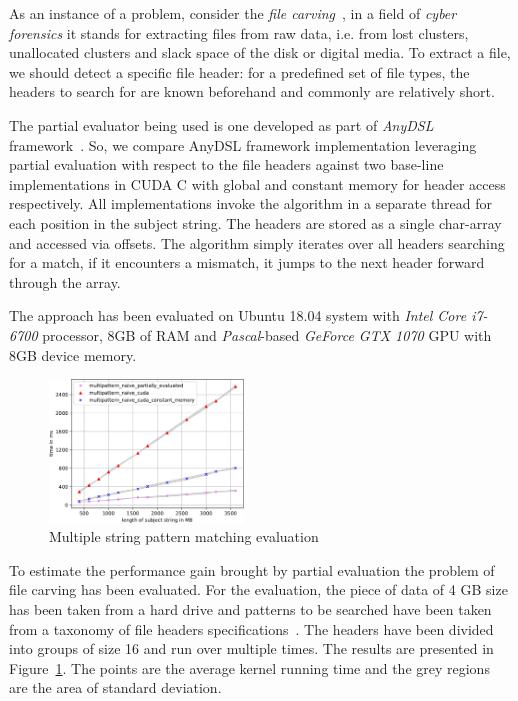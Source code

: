 \documentclass[sigplan]{acmart}\settopmatter{printacmref=false, printfolios=false}
\begin{document}
As an instance of a problem, consider the \textit{file carving}~\cite{DataCarving}, in a field of \textit{cyber forensics} it stands for extracting files from raw data, i.e. from lost clusters, unallocated clusters and slack space of the disk or digital media.
To extract a file, we should detect a specific file header: for a predefined set of file types, the headers to search for are known beforehand and commonly are relatively short.

The partial evaluator being used is one developed as part of \textit{AnyDSL} framework~\cite{LeiBa}.
So, we compare AnyDSL framework implementation leveraging partial evaluation with respect to the file headers against two base-line implementations in CUDA C with global and constant memory for header access respectively.
All implementations invoke the algorithm in a separate thread for each position in the subject string.
The headers are stored as a single char-array and accessed via offsets.
The algorithm simply iterates over all headers searching for a match, if it encounters a mismatch, it jumps to the next header forward through the array.


The approach has been evaluated on Ubuntu 18.04 system with \textit{Intel Core i7-6700} processor, 8GB of RAM and \textit{Pascal}-based \textit{GeForce GTX 1070} GPU with 8GB device memory.

\begin{figure}[t]
  \centering
  \includegraphics[width=0.46\textwidth]{results.pdf}
  \caption{Multiple string pattern matching evaluation}
  \label{fig:eval}
\end{figure}

To estimate the performance gain brought by partial evaluation the problem of file carving has been evaluated.
For the evaluation, the piece of data of 4 GB size has been taken from a hard drive and patterns to be searched have been taken from a taxonomy of file headers specifications~\cite{Headers}.
The headers have been divided into groups of size 16 and run over multiple times.
The results are presented in Figure~\ref{fig:eval}.
The points are the average kernel running time and the grey regions are the area of standard deviation.
\end{document}
